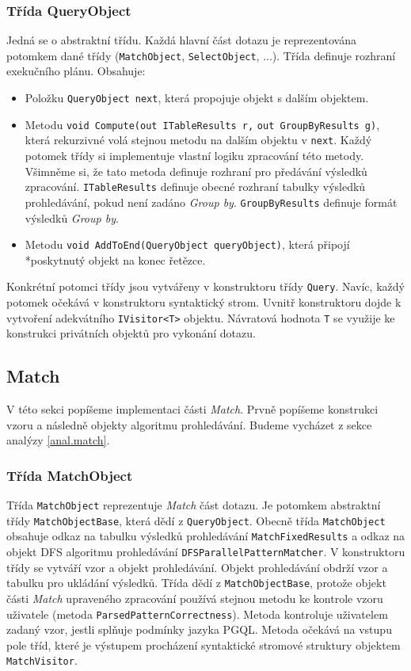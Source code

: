 \subsubsection{Třída QueryObject}

Jedná se o abstraktní třídu.
Každá hlavní část dotazu je reprezentována potomkem dané třídy (\texttt{MatchObject}, \texttt{SelectObject}, ...).
Třída definuje rozhraní exekučního plánu.
Obsahuje:
\begin{itemize}
\item Položku \texttt{QueryObject next}, která propojuje objekt s dalším objektem.
\item Metodu \texttt{void Compute(out ITableResults r,} \texttt{out GroupByResults g)}, která rekurzivné volá stejnou metodu na dalším objektu v \texttt{next}.
Každý potomek třídy si implementuje vlastní logiku zpracování této metody.
Všimněme si, že tato metoda definuje rozhraní pro předávání výsledků zpracování.
\texttt{ITableResults} definuje obecné rozhraní tabulky výsledků prohledávání, pokud není zadáno \textit{Group by}.
\texttt{GroupByResults} definuje formát výsledků \textit{Group by}.
\item Metodu \texttt{void AddToEnd(QueryObject queryObject)}, která připojí \\*poskytnutý objekt na konec řetězce.
\end{itemize}
Konkrétní potomci třídy jsou vytvářeny v konstruktoru třídy \texttt{Query}.
Navíc, každý potomek očekává v konstruktoru syntaktický strom.
Uvnitř konstruktoru dojde k vytvoření adekvátního \texttt{IVisitor<T>} objektu.
Návratová hodnota \texttt{T} se využije ke konstrukci privátních objektů pro vykonání dotazu.

\subsection{Match} \label{impl.match}

V této sekci popíšeme implementaci části \textit{Match}.
Prvně popíšeme konstrukci vzoru a následně objekty algoritmu prohledávání.
Budeme vycházet z sekce analýzy \ref{anal.match}.

\subsubsection{Třída MatchObject}

Třída \texttt{MatchObject} reprezentuje \textit{Match} část dotazu.
Je potomkem abstraktní třídy \texttt{MatchObjectBase}, která dědí z \texttt{QueryObject}.
Obecně třída \texttt{MatchObject} obsahuje odkaz na tabulku výsledků prohledávání \texttt{MatchFixedResults} a odkaz na objekt DFS algoritmu prohledávání \texttt{DFSParallelPatternMatcher}.
V konstruktoru třídy se vytváří vzor a objekt prohledávání.
Objekt prohledávání obdrží vzor a tabulku pro ukládání výsledků.
Třída dědí z \texttt{MatchObjectBase}, protože objekt části \textit{Match} upraveného zpracování používá stejnou metodu ke kontrole vzoru uživatele (metoda \texttt{ParsedPatternCorrectness}).
Metoda kontroluje uživatelem zadaný vzor, jestli splňuje podmínky jazyka PGQL. 
Metoda očekává na vstupu pole tříd, které je výstupem procházení syntaktické stromové struktury objektem \texttt{MatchVisitor}. 

